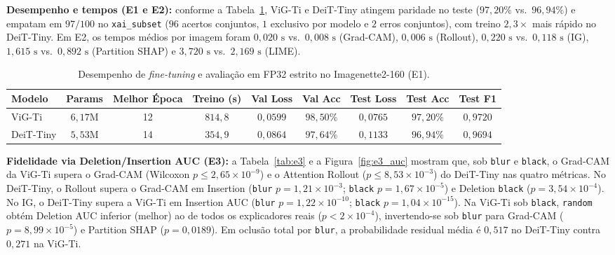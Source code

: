 \documentclass{article}
\begin{document}
\textbf{Desempenho e tempos (E1 e E2):} conforme a Tabela~\ref{tab:e1}, ViG-Ti e DeiT-Tiny atingem paridade no teste ($97{,}20\%$ vs.\ $96{,}94\%$) e empatam em $97/100$ no \texttt{xai\_subset} ($96$ acertos conjuntos, $1$ exclusivo por modelo e $2$ erros conjuntos), com treino $2{,}3\times$ mais rápido no DeiT-Tiny. Em E2, os tempos médios por imagem foram $0{,}020\text{ s}$ vs.\ $0{,}008\text{ s}$ (Grad-CAM), $0{,}006\text{ s}$ (Rollout), $0{,}220\text{ s}$ vs.\ $0{,}118\text{ s}$ (IG), $1{,}615\text{ s}$ vs.\ $0{,}892\text{ s}$ (Partition SHAP) e $3{,}720\text{ s}$ vs.\ $2{,}169\text{ s}$ (LIME).

\begin{table}[t]
  \caption{Desempenho de \textit{fine-tuning} e avaliação em FP32 estrito no Imagenette2-160 (E1).}
  \label{tab:e1}
  \centering
  \footnotesize
  \setlength{\tabcolsep}{4.5pt}
  \begin{tabular}{lcccccccc}
    \toprule
    Modelo & Params & Melhor Época & Treino (s) & Val Loss & Val Acc & Test Loss & Test Acc & Test F1 \\
    \midrule
    ViG-Ti    & $6{,}17\text{M}$ & 12 & $814{,}8$ & $0{,}0599$ & $98{,}50\%$ & $0{,}0765$ & $97{,}20\%$ & $0{,}9720$ \\
    DeiT-Tiny & $5{,}53\text{M}$ & 14 & $354{,}9$ & $0{,}0864$ & $97{,}64\%$ & $0{,}1133$ & $96{,}94\%$ & $0{,}9694$ \\
    \bottomrule
  \end{tabular}
\end{table}

\textbf{Fidelidade via Deletion/Insertion AUC (E3):} a Tabela~\ref{tab:e3} e a Figura~\ref{fig:e3_auc} mostram que, sob \texttt{blur} e \texttt{black}, o Grad-CAM da ViG-Ti supera o Grad-CAM (Wilcoxon $p \le 2{,}65 \times 10^{-9}$) e o Attention Rollout ($p \le 8{,}53 \times 10^{-3}$) do DeiT-Tiny nas quatro métricas. No DeiT-Tiny, o Rollout supera o Grad-CAM em Insertion (\texttt{blur} $p = 1{,}21 \times 10^{-3}$; \texttt{black} $p = 1{,}67 \times 10^{-5}$) e Deletion \texttt{black} ($p = 3{,}54 \times 10^{-4}$). No IG, o DeiT-Tiny supera a ViG-Ti em Insertion AUC (\texttt{blur} $p = 1{,}22 \times 10^{-10}$; \texttt{black} $p = 1{,}04 \times 10^{-15}$). Na ViG-Ti sob \texttt{black}, \texttt{random} obtém Deletion AUC inferior (melhor) ao de todos os explicadores reais ($p < 2 \times 10^{-4}$), invertendo-se sob \texttt{blur} para Grad-CAM ($p = 8{,}99 \times 10^{-5}$) e Partition SHAP ($p = 0{,}0189$). Em oclusão total por \texttt{blur}, a probabilidade residual média é $0{,}517$ no DeiT-Tiny contra $0{,}271$ na ViG-Ti.
\end{document}
